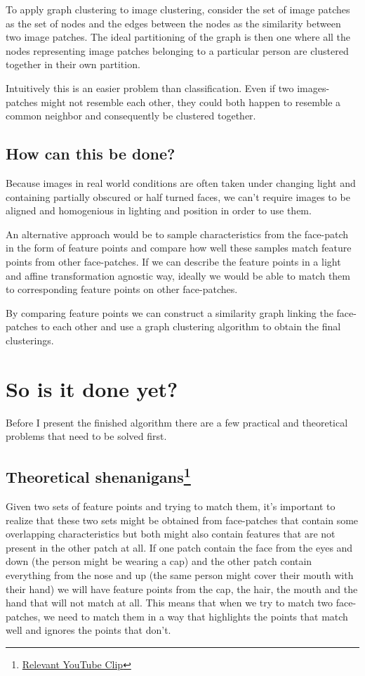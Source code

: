 \documentclass{article}
\begin{document}
To apply graph clustering to image clustering, consider the set of image 
patches as the set of nodes and the edges between the nodes as the similarity 
between two image patches. The ideal partitioning of the graph is then one 
where all the nodes representing image patches belonging to a particular person 
are clustered together in their own partition.

Intuitively this is an easier problem than classification. Even if two 
images-patches might not resemble each other, they could both happen to 
resemble a common neighbor and consequently be clustered together.

\subsection{How can this be done?}
Because images in real world conditions are often taken under changing light 
and containing partially obscured or half turned faces, we can't require images 
to be aligned and homogenious in lighting and position in order to use them.  

An alternative approach would be to sample characteristics from the face-patch 
in the form of feature points and compare how well these samples match feature 
points from other face-patches. If we can describe the feature points in a 
light and affine transformation agnostic way, ideally we would be able to match 
them to corresponding feature points on other face-patches.

By comparing feature points we can construct a similarity graph linking the 
face-patches to each other and use a graph clustering algorithm to obtain the 
final clusterings.

\section{So is it done yet?}
Before I present the finished algorithm there are a few practical and 
theoretical problems that need to be solved first.

\subsection{Theoretical shenanigans\footnote{%
\href{http://www.youtube.com/watch?v=MFZG8KQJni8}{Relevant YouTube Clip}}}

Given two sets of feature points and trying to match them, it's important to 
realize that these two sets might be obtained from face-patches that contain 
some overlapping characteristics but both might also contain features that are 
not present in the other patch at all. If one patch contain the face from the 
eyes and down (the person might be wearing a cap) and the other patch contain 
everything from the nose and up (the same person might cover their mouth with 
their hand) we will have feature points from the cap, the hair, the mouth and 
the hand that will not match at all. This means that when we try to match two 
face-patches, we need to match them in a way that highlights the points that 
match well and ignores the points that don't.
\end{document}

